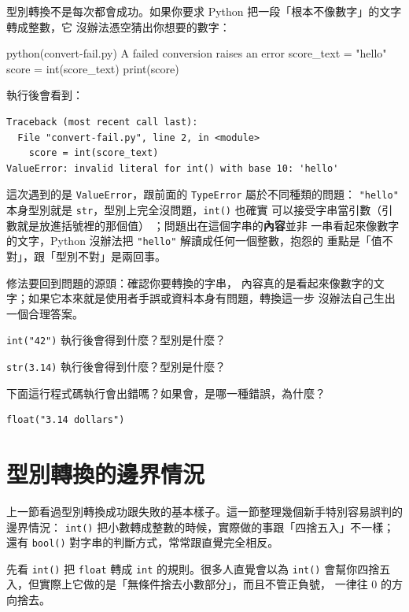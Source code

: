 型別轉換不是每次都會成功。如果你要求 Python 把一段「根本不像數字」的文字轉成整數，它
沒辦法憑空猜出你想要的數字：

\begin{example}{python}{(convert-fail.py) A failed conversion raises an error}
score_text = "hello"
score = int(score_text)
print(score)
\end{example}

執行後會看到：

\begin{verbatim}
Traceback (most recent call last):
  File "convert-fail.py", line 2, in <module>
    score = int(score_text)
ValueError: invalid literal for int() with base 10: 'hello'
\end{verbatim}

這次遇到的是 \texttt{ValueError}，跟前面的 \texttt{TypeError} 屬於不同種類的問題：
\texttt{"hello"} 本身型別就是 \texttt{str}，型別上完全沒問題，\texttt{int()} 也確實
可以接受字串當引數（引數就是放進括號裡的那個值）
；問題出在這個字串的\textbf{內容}並非
一串看起來像數字的文字，Python 沒辦法把 \texttt{"hello"} 解讀成任何一個整數，抱怨的
重點是「值不對」，跟「型別不對」是兩回事。

修法要回到問題的源頭：確認你要轉換的字串，
內容真的是看起來像數字的文字；如果它本來就是使用者手誤或資料本身有問題，轉換這一步
沒辦法自己生出一個合理答案。

\begin{drills}[label=drills:type-conversion]
\item \texttt{int("42")} 執行後會得到什麼？型別是什麼？
\item \texttt{str(3.14)} 執行後會得到什麼？型別是什麼？
\item 下面這行程式碼執行會出錯嗎？如果會，是哪一種錯誤，為什麼？
\begin{verbatim}
float("3.14 dollars")
\end{verbatim}
\end{drills}

\section{型別轉換的邊界情況}
\label{sec:conversion-edge-cases}

上一節看過型別轉換成功跟失敗的基本樣子。這一節整理幾個新手特別容易誤判的邊界情況：
\texttt{int()} 把小數轉成整數的時候，實際做的事跟「四捨五入」不一樣；還有 \texttt{bool()}
對字串的判斷方式，常常跟直覺完全相反。

先看 \texttt{int()} 把 \texttt{float} 轉成 \texttt{int} 的規則。很多人直覺會以為
\texttt{int()} 會幫你四捨五入，但實際上它做的是「無條件捨去小數部分」，而且不管正負號，
一律往 0 的方向捨去。

